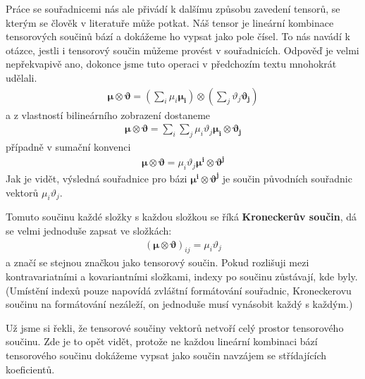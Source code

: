 \documentclass[a5paper,12pt]{amsbook}
\theoremstyle{definition}
\newcommand{\myvec}[1]{\bm{#1}}
\begin{document}
Práce se souřadnicemi nás ale přivádí k dalšímu způsobu zavedení tensorů, se kterým se
člověk v literatuře může potkat. Náš tensor je lineární kombinace tensorových součinů
bází a dokážeme ho vypsat jako pole čísel. To nás navádí k otázce, jestli i tensorový
součin můžeme provést v souřadnicích. Odpověď je velmi nepřekvapivě ano, dokonce jsme
tuto operaci v předchozím textu mnohokrát udělali.
\begin{equation*}
\begin{split}
\myvec{\mu}\otimes\myvec{\vartheta} 
= \left(\sum_i\mu_i\myvec{\mu_i}\right)\otimes\left(\sum_j\vartheta_j\myvec{\vartheta_j}\right)
\end{split}
\end{equation*}
a z vlastností bilineárního zobrazení dostaneme
\begin{equation*}
\begin{split}
\myvec{\mu}\otimes\myvec{\vartheta} 
= \sum_i\sum_j\mu_i\vartheta_j\myvec{\mu_i}\otimes\myvec{\vartheta_j}
\end{split}
\end{equation*}
případně v sumační konvenci
\begin{equation*}
\begin{split}
\myvec{\mu}\otimes\myvec{\vartheta} = \mu_i\vartheta_j\myvec{\mu^i}\otimes\myvec{\vartheta^j}
\end{split}
\end{equation*}
Jak je vidět, výsledná souřadnice pro bázi $\myvec{\mu^i}\otimes\myvec{\vartheta^j}$ je
součin původních souřadnic vektorů $\mu_i\vartheta_j$.

Tomuto součinu každé složky s každou složkou se říká \textbf{Kroneckerův součin}, dá
se velmi jednoduše zapsat ve složkách:
\begin{equation*}
\begin{split}
\left(\myvec{\mu}\otimes\myvec{\vartheta}\right)_{ij} = \mu_i\vartheta_j
\end{split}
\end{equation*}
a značí se stejnou značkou jako tensorový součin. Pokud rozlišuji mezi kontravariatními
a kovariantními složkami, indexy po součinu zůstávají, kde byly. (Umístění indexů pouze
napovídá zvláštní formátování souřadnic, Kroneckerovu součinu na formátování nezáleží,
on jednoduše musí vynásobit každý s každým.)

Už jsme si řekli, že tensorové součiny vektorů netvoří celý prostor tensorového součinu.
Zde je to opět vidět, protože ne každou lineární kombinaci bází tensorového součinu dokážeme
vypsat jako součin navzájem se střídajících koeficientů.
\end{document}
